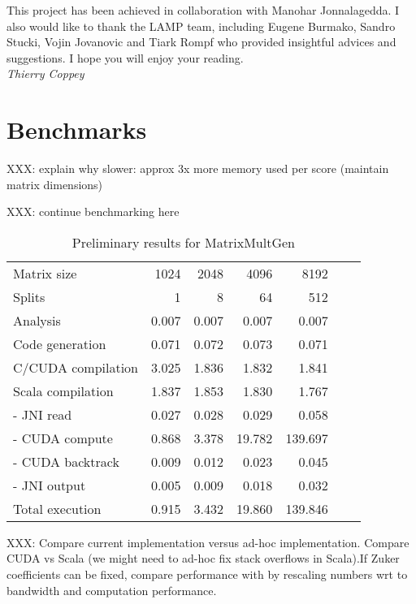 \documentclass[11pt]{article}
\begin{document}
\vfill
This project has been achieved in collaboration with Manohar Jonnalagedda. I also would like to thank the LAMP team, including Eugene Burmako, Sandro Stucki, Vojin Jovanovic and Tiark Rompf who provided insightful advices and suggestions. I hope you will enjoy your reading. \vspace{.3cm}\\
\textit{Thierry Coppey}

\newpage
\setcounter{tocdepth}{2} \tableofcontents





\section{Benchmarks}
{\color{red} XXX: explain why slower: approx 3x more memory used per score (maintain matrix dimensions)

XXX: continue benchmarking here
}
\begin{table}[H]\begin{center}\begin{tabular}{lrrrrrr} \toprule
Matrix size			& 1024	& 2048	& 4096	& 8192 \\
Splits				& 1		& 8		& 64		& 512 \\ \midrule
Analysis				& 0.007	& 0.007	& 0.007	& 0.007 \\
Code generation		& 0.071	& 0.072	& 0.073	& 0.071 \\
C/CUDA compilation	& 3.025	& 1.836	& 1.832	& 1.841 \\
Scala compilation		& 1.837	& 1.853	& 1.830	& 1.767 \\ \midrule
- JNI read				& 0.027	& 0.028	& 0.029	& 0.058 \\
- CUDA compute		& 0.868	& 3.378	& 19.782	& 139.697 \\
- CUDA backtrack		& 0.009	& 0.012	& 0.023	& 0.045 \\
- JNI output			& 0.005	& 0.009	& 0.018	& 0.032 \\
Total execution			& 0.915	& 3.432	& 19.860	& 139.846 \\ \bottomrule
\end{tabular}\end{center}\caption{Preliminary results for MatrixMultGen}\end{table}

{\color{red} XXX: Compare current implementation versus ad-hoc implementation. Compare CUDA vs Scala (we might need to ad-hoc fix stack overflows in Scala).If Zuker coefficients can be fixed, compare performance with \cite{adp_gpu} by rescaling numbers wrt to bandwidth and computation performance.}
\end{document}
